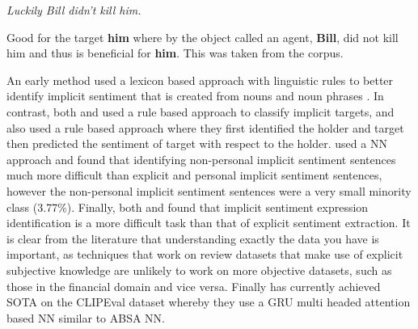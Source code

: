 \begin{example}
\textit{Luckily Bill didn’t kill him.}
\caption{Good for the target \textbf{him} where by the object called an agent, \textbf{Bill}, did not kill him and thus is beneficial for \textbf{him}. This was taken from the \citet{deng-etal-2013-benefactive} corpus.}
\label{example:lit_review_good_for}
\end{example}

An early method used a lexicon based approach with linguistic rules to better identify implicit sentiment that is created from nouns and noun phrases \citep{zhang-liu-2011-identifying}. In contrast, both \citet{deng-wiebe-2014-sentiment} and \citet{deng-etal-2014-joint} used a rule based approach to classify implicit targets, and \citet{deng-wiebe-2015-joint} also used a rule based approach where they first identified the holder and target then predicted the sentiment of target with respect to the holder. \citet{maehlum-etal-2019-annotating} used a NN approach and found that identifying non-personal implicit sentiment sentences much more difficult than explicit and personal implicit sentiment sentences, however the non-personal implicit sentiment sentences were a very small minority class (3.77\%). Finally, both \citet{irsoy-cardie-2014-opinion} and \citet{han-kando-2019-opinion} found that implicit sentiment expression identification is a more difficult task than that of explicit sentiment extraction. It is clear from the literature that understanding exactly the data you have is important, as techniques that work on review datasets that make use of explicit subjective knowledge are unlikely to work on more objective datasets, such as those in the financial domain and vice versa. Finally \citet{xiang2019identifying} has currently achieved SOTA on the CLIPEval dataset \citep{russo-etal-2015-semeval} whereby they use a GRU multi headed attention based NN similar to \citet{wang-etal-2016-attention} ABSA NN.

